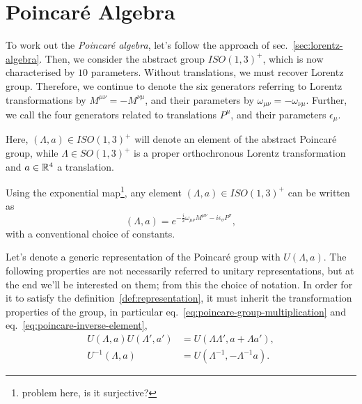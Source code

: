 \section{Poincaré Algebra}
To work out the \emph{Poincaré algebra}, let's follow the approach of sec.~\ref{sec:lorentz-algebra}. Then, we consider the abstract group $ISO(1,3)^+$, which is now characterised by $10$ parameters. Without translations, we must recover Lorentz group. Therefore, we continue to denote the six generators referring to Lorentz transformations by $M^{\mu\nu} = -M^{\nu\mu}$, and their parameters by $\omega_{\mu\nu}=-\omega_{\nu\mu}$. Further, we call the four generators related to translations $P^\mu$, and their parameters $\epsilon_\mu$.

Here, $(\Lambda,a) \in ISO(1,3)^+$ will denote an element of the abstract Poincaré group, while $\Lambda \in SO(1,3)^+$ is a proper orthochronous Lorentz transformation and $a \in \mathbb{R}^4$ a translation.

Using the exponential map\footnote{\color{red}problem here, is it surjective?\color{black}}, any element $(\Lambda,a) \in ISO(1,3)^+$ can be written as
\begin{equation}
    (\Lambda,a) = e^{-\frac{i}{2} \omega_{\mu\nu} M^{\mu\nu} - i \epsilon_\sigma P^\sigma},
\end{equation}
with a conventional choice of constants.

Let's denote a generic representation of the Poincaré group with $U(\Lambda, a)$. The following properties are not necessarily referred to unitary representations, but at the end we'll be interested on them; from this the choice of notation. In order for it to satisfy the definition~\ref{def:representation}, it must inherit the transformation properties of the group, in particular eq.~\eqref{eq:poincare-group-multiplication} and eq.~\eqref{eq:poincare-inverse-element},
\begin{subequations}
\begin{align}
    U(\Lambda, a) U(\Lambda',a') &= U(\Lambda\Lambda', a + \Lambda a') , \label{eq:representation-poincare-group-multiplication} \\
    U^{-1} (\Lambda, a) &= U(\Lambda^{-1},-\Lambda^{-1}a) . \label{eq:representation-poincare-inverse-element}
\end{align}
\end{subequations}

